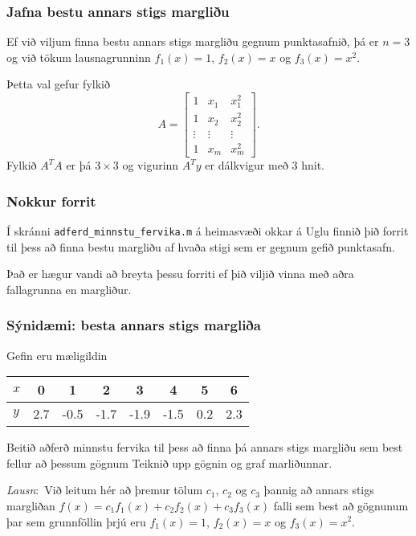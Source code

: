\documentclass[icelandic,a4paper,12pt]{article}
\begin{document}
\subsubsection{Jafna bestu annars stigs margliðu}
Ef við viljum finna bestu annars stigs margliðu gegnum punktasafnið,
þá er  
$n=3$ og við tökum lausnagrunninn $f_1(x)=1$, $f_2(x)=x$  og 
$f_3(x)=x^2$.  

\pause
\smallskip
Þetta val gefur fylkið
\begin{equation*}
	A = \left[\begin{matrix} 
		1& x_1 & x_1^2\\
		1& x_2 & x_2^2\\
		\vdots &\vdots &\vdots\\
		1& x_m& x_m^2 
	\end{matrix}\right].
\end{equation*}
Fylkið $A^TA$ er þá $3\times 3$ og vigurinn $A^Ty$ er dálkvigur með
$3$ hnit.  


\subsubsection{Nokkur forrit} 
Í skránni {\tt adferd\_minnstu\_fervika.m}
á heimasvæði okkar á Uglu finnið þið forrit til þess að finna bestu
margliðu af hvaða stigi sem er gegnum gefið punktasafn.   

\pause
\smallskip
Það er hægur vandi að breyta þessu forriti ef þið viljið vinna með
aðra fallagrunna en margliður.


\subsubsection{Sýnidæmi:   besta annars stigs margliða} 
Gefin eru mæligildin 

\begin{center}
\begin{tabular}{l|ccccccc}
$x$ & 0& 1 & 2 & 3 & 4 & 5 & 6\\ \hline
$y$ & 2.7 & -0.5  & -1.7 &-1.9 & -1.5 & 0.2 &2.3 
\end{tabular}
\end{center}
Beitið aðferð minnstu fervika til þess að finna 
þá annars stigs margliðu sem best fellur að þessum gögnum
Teiknið upp gögnin og graf marliðunnar.

\pause
\bigskip
{\it Lausn}:\  Við leitum hér að þremur tölum $c_1$, $c_2$ og 
$c_3$ þannig að annars stigs margliðan
$f(x)=c_1f_1(x)+c_2f_2(x)+c_3f_3(x)$  falli sem best að gögnunum
þar sem grunnföllin þrjú eru
$f_1(x)=1$, $f_2(x)=x$ og $f_3(x)=x^2$.
\end{document}
